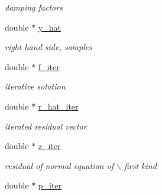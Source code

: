 \begin{CompactItemize}
\begin{CompactList}\small\item\em damping factors \item\end{CompactList}\item 
\hypertarget{structinfct__adjoint__plan_4a98ec178d9d74dab4e617beebc419a6}{
double $\ast$ \hyperlink{structinfct__adjoint__plan_4a98ec178d9d74dab4e617beebc419a6}{y\_\-hat}}
\label{structinfct__adjoint__plan_4a98ec178d9d74dab4e617beebc419a6}

\begin{CompactList}\small\item\em right hand side, samples \item\end{CompactList}\item 
\hypertarget{structinfct__adjoint__plan_f72ea2aed94d3e789dd064776fdf2919}{
double $\ast$ \hyperlink{structinfct__adjoint__plan_f72ea2aed94d3e789dd064776fdf2919}{f\_\-iter}}
\label{structinfct__adjoint__plan_f72ea2aed94d3e789dd064776fdf2919}

\begin{CompactList}\small\item\em iterative solution \item\end{CompactList}\item 
\hypertarget{structinfct__adjoint__plan_3bb77b67c3779716d767e76b8661efbc}{
double $\ast$ \hyperlink{structinfct__adjoint__plan_3bb77b67c3779716d767e76b8661efbc}{r\_\-hat\_\-iter}}
\label{structinfct__adjoint__plan_3bb77b67c3779716d767e76b8661efbc}

\begin{CompactList}\small\item\em iterated residual vector \item\end{CompactList}\item 
\hypertarget{structinfct__adjoint__plan_5b1da212f8c15d7ca209dbe347a5ec8f}{
double $\ast$ \hyperlink{structinfct__adjoint__plan_5b1da212f8c15d7ca209dbe347a5ec8f}{z\_\-iter}}
\label{structinfct__adjoint__plan_5b1da212f8c15d7ca209dbe347a5ec8f}

\begin{CompactList}\small\item\em residual of normal equation of $\backslash$ first kind \item\end{CompactList}\item 
\hypertarget{structinfct__adjoint__plan_6c81df2130d05bcbbcd6646cd27b671e}{
double $\ast$ \hyperlink{structinfct__adjoint__plan_6c81df2130d05bcbbcd6646cd27b671e}{p\_\-iter}}
\label{structinfct__adjoint__plan_6c81df2130d05bcbbcd6646cd27b671e}


\end{CompactItemize}
